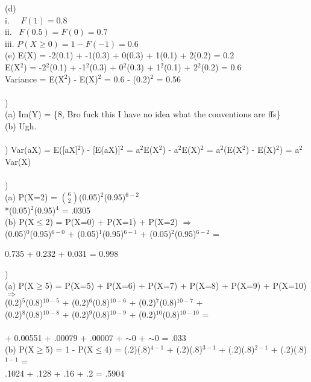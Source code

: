 \documentclass[12pt]{article}
\begin{document}
\indent (d) \\
\indent \indent i. \ \ $F(1) = 0.8$\\[.4em]
\indent \indent ii. \ $F(0.5) = F(0) = 0.7$\\[.4em]
\indent \indent iii. $P(X \ge 0) = 1-F(-1) = 0.6$\\

\indent (e) E(X) = -2(0.1) + -1(0.3) + 0(0.3) + 1(0.1) + 2(0.2) = 0.2\\[.4em]
\indent \indent E(X$^2$) = -2$^2$(0.1) + -1$^2$(0.3) + 0$^2$(0.3) + 1$^2$(0.1) + 2$^2$(0.2) = 0.6\\[.4em]
\indent \indent Variance = E(X$^2$) - E(X)$^2$ = 0.6 - (0.2)$^2$ = 0.56\\



\noindent \hrulefill \\


)\\
\indent (a) Im(Y) = \{8, Bro fuck this I have no idea what the conventions are ffs\}\\

\indent (b) Ugh.\\


\noindent \hrulefill \\


) Var(aX) = E([aX]$^2$) - [E(aX)]$^2$ = a$^2$E(X$^2$) - a$^2$E(X)$^2$ = a$^2$(E(X$^2$) - E(X)$^2$) =  a$^2$Var(X)\\


\noindent \hrulefill \\


) \\ 
\indent (a) P(X=2) = {\Large$\binom{6}{2}$}(0.05)$^2$(0.95)$^{6-2}$\\[.4em]
\indent {}*(0.05)$^2$(0.95)$^{4}$ = .0305\\

\indent (b) P(X$\le$2) = P(X=0) + P(X=1) + P(X=2) $\Rightarrow$\\[.4em]
\indent {}(0.05)$^0$(0.95)$^{6-0}$ +
(0.05)$^1$(0.95)$^{6-1}$ +
(0.05)$^2$(0.95)$^{6-2}$ =\\[.4em]
\centerline{ 0.735 + 0.232 + 0.031 = 0.998 }


\noindent \hrulefill 
\pagebreak


)\\
\indent (a) P(X$\ge$5) = P(X=5) + P(X=6) + P(X=7) + P(X=8) + P(X=9) + P(X=10) $\Rightarrow$\\[.4em]
\indent {}(0.2)$^{5}$(0.8)$^{10-5}$ +
(0.2)$^{6}$(0.8)$^{10-6}$ +
(0.2)$^{7}$(0.8)$^{10-7}$ +\\[.4em]
\indent {}(0.2)$^{8}$(0.8)$^{10-8}$ +
(0.2)$^{9}$(0.8)$^{10-9}$ +
(0.2)$^{10}$(0.8)$^{10-10}$ =\\\\
\indent {} + 0.00551 + .00079 + .00007 + $\sim$0 + $\sim$0 = .033\\

\indent (b) P(X$\ge$5) = 1 - P(X$\le$4) = (.2)(.8)$^{4-1}$ + (.2)(.8)$^{3-1}$ + (.2)(.8)$^{2-1}$ + (.2)(.8)$^{1-1}$ =\\[.4em]
\indent \indent .1024 + .128 + .16 + .2 = .5904
\end{document}
